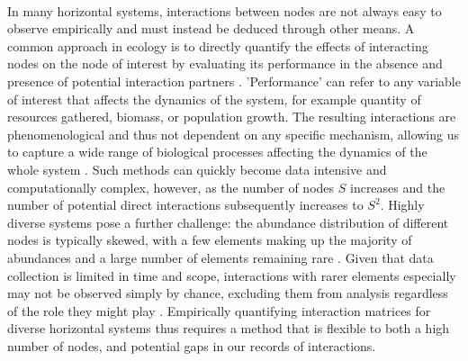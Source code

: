 \documentclass[a4,12pt]{article}
\begin{document}
    \paragraph{} 
    In many horizontal systems, interactions between nodes are not always easy to observe empirically and must instead be deduced through other means. A common approach in ecology is to directly quantify the effects of interacting nodes on the node of interest by evaluating its performance in the absence and presence of potential interaction partners \parencite{Connell1961, Grace1990}. 'Performance' can refer to any variable of interest that affects the dynamics of the system, for example quantity of resources gathered, biomass, or population growth. The resulting interactions are phenomenological and thus not dependent on any specific mechanism, allowing us to capture a wide range of biological processes affecting the dynamics of the whole system \parencite{Novak2010}. Such methods can quickly become data intensive and computationally complex, however, as the number of nodes $S$ increases and the number of potential direct interactions subsequently increases to $S^2$. Highly diverse systems pose a further challenge: the abundance distribution of different nodes is typically skewed, with a few elements making up the majority of abundances and a large number of elements remaining rare \parencite{Fisher1943}. Given that data collection is limited in time and scope, interactions with rarer elements especially may not be observed simply by chance, excluding them from analysis regardless of the role they might play \parencite{Olesen2011}. Empirically quantifying interaction matrices for diverse horizontal systems thus requires a method that is flexible to both a high number of nodes, and potential gaps in our records of interactions. 
\end{document}

